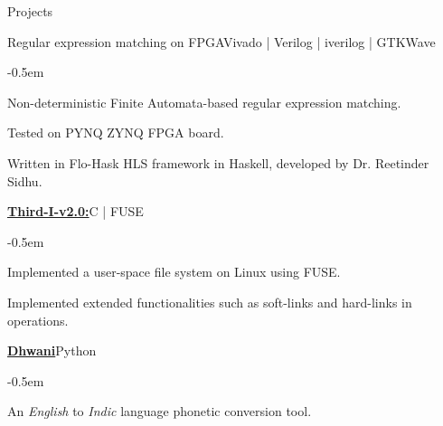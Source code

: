 \documentclass{CV} %
\begin{document}
\begin{rSection}{Projects}
  \begin{rSubsection}{Regular expression matching on FPGA}{}{Vivado | Verilog | iverilog | GTKWave}{}
    \begin{list}{}{\footnotesize}\itemsep -0.5em \vspace{-0.5em}
    \item Non-deterministic Finite Automata-based regular expression matching.
    \item Tested on PYNQ ZYNQ FPGA board.
    \item Written in Flo-Hask HLS framework in Haskell, developed by Dr. Reetinder Sidhu.
    \end{list}
  \end{rSubsection}

  \begin{rSubsection}{\textbf{\href{https://github.com/ndyashas/Third-I-v2.0}{Third-I-v2.0:}}}{}{C | FUSE}{}
    \begin{list}{}{\footnotesize}\itemsep -0.5em \vspace{-0.5em}
    \item Implemented a user-space file system on Linux using FUSE.
    \item Implemented extended functionalities such as soft-links and hard-links in operations.
    \end{list}
  \end{rSubsection}


  \begin{rSubsection}{\textbf{\href{https://ndyashas.github.io/projects/Dhwani.html}{Dhwani}}}{}{Python}{}
    \begin{list}{}{\footnotesize}\itemsep -0.5em \vspace{-0.5em}
    \item An \textit{English} to \textit{Indic} language phonetic conversion tool.
    \end{list}
  \end{rSubsection}

\end{rSection}


\end{document}
